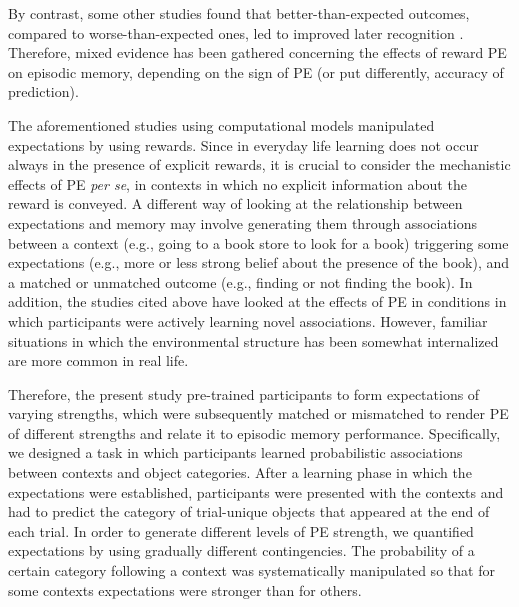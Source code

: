 \documentclass[a4paper,12pt]{article}
\begin{document}
By contrast, some other studies found that better-than-expected outcomes, compared to worse-than-expected ones, led to improved later recognition  \cite[][Experiment 2 ]{Jang2019, de2018signed, Rouhani2021}. Therefore, mixed evidence has been gathered concerning the effects of reward PE on episodic memory, depending on the sign of PE (or put differently, accuracy of prediction). \par%
The aforementioned studies using computational models manipulated expectations by using rewards. Since in everyday life learning does not occur always in the presence of explicit rewards, it is crucial to consider the mechanistic effects of PE \textit{per se}, in contexts in which no explicit information about the reward is conveyed. A different way of looking at the relationship between expectations and memory may involve generating them through associations between a context (e.g., going to a book store to look for a book) triggering some expectations (e.g., more or less strong belief about the presence of the book), and a matched or unmatched outcome (e.g., finding or not finding the book). 
In addition, the studies cited above have looked at the effects of PE in conditions in which participants were actively learning novel associations. However, familiar situations in which the environmental structure has been somewhat internalized are more common in real life.  
\par Therefore, the present study pre-trained participants to form expectations of varying strengths, which were subsequently matched or mismatched to render PE of different strengths and relate it to episodic memory performance. Specifically, we designed a task in which participants learned probabilistic associations between contexts and object categories. After a learning phase in which the expectations were established, participants were presented with the contexts and had to predict the category of trial-unique objects that appeared at the end of each trial. In order to generate different levels of PE strength, we quantified expectations by using gradually different contingencies. The probability of a certain category following a context was systematically manipulated so that for some contexts expectations were stronger than for others.
\end{document}
